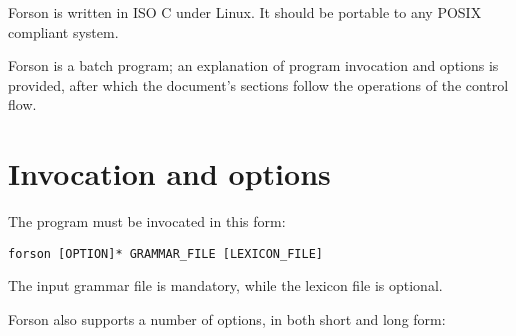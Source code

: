 \documentclass[a4paper,12pt]{article}
\begin{document}
Forson is written in ISO C under Linux. It should be portable to any POSIX compliant system.

Forson is a batch program; an explanation of program invocation and options is provided, after which the document's sections follow the operations of the control flow.


\section{Invocation and options}
\noindent
The program must be invocated in this form:

\begin{verbatim}
forson [OPTION]* GRAMMAR_FILE [LEXICON_FILE]
\end{verbatim}

\noindent
The input grammar file is mandatory, while the lexicon file is optional.

\noindent
Forson also supports a number of options, in both short and long form:
\end{document}
